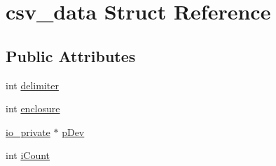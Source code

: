 \hypertarget{structcsv__data}{\section{csv\-\_\-data Struct Reference}
\label{d0/d69/structcsv__data}
}
\subsection*{Public Attributes}
\begin{DoxyCompactItemize}
\item 
int \hyperlink{structcsv__data_a96de82a978f4a066651d92bc39608aa7}{delimiter}
\item 
int \hyperlink{structcsv__data_a4f06bac8a83d2fc126b8f1edec36f69b}{enclosure}
\item 
\hyperlink{structio__private}{io\-\_\-private} $\ast$ \hyperlink{structcsv__data_ad705a8529fb6354a5c2a032039659ef0}{p\-Dev}
\item 
int \hyperlink{structcsv__data_a33a6cb77ea76ccfeeef603992cf20521}{i\-Count}
\end{DoxyCompactItemize}


